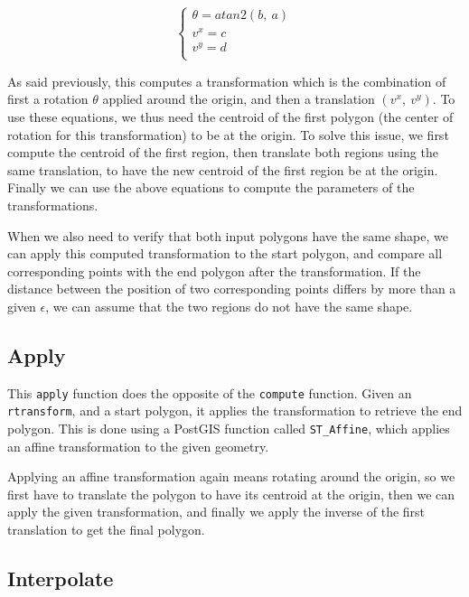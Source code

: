 \[
    \begin{cases}
        \theta = atan2(b,\ a) \\
        v^x = c \\
        v^y = d \\
    \end{cases}
\]

As said previously, this computes a transformation which is the combination of first a rotation $\theta$ applied around the origin, and then a translation $(v^x,\ v^y)$. To use these equations, we thus need the centroid of the first polygon (the center of rotation for this transformation) to be at the origin. To solve this issue, we first compute the centroid of the first region, then translate both regions using the same translation, to have the new centroid of the first region be at the origin. Finally we can use the above equations to compute the parameters of the transformations.

When we also need to verify that both input polygons have the same shape, we can apply this computed transformation to the start polygon, and compare all corresponding points with the end polygon after the transformation. If the distance between the position of two corresponding points differs by more than a given $\epsilon$, we can assume that the two regions do not have the same shape.

\subsection{Apply}
\label{section:apply}

This \lstinline{apply} function does the opposite of the \lstinline{compute} function. Given an \lstinline{rtransform}, and a start polygon, it applies the transformation to retrieve the end polygon. This is done using a PostGIS function called \lstinline{ST_Affine}, which applies an affine transformation to the given geometry. 

Applying an affine transformation again means rotating around the origin, so we first have to translate the polygon to have its centroid at the origin, then we can apply the given transformation, and finally we apply the inverse of the first translation to get the final polygon.

\subsection{Interpolate}
\label{section:interpolate}

